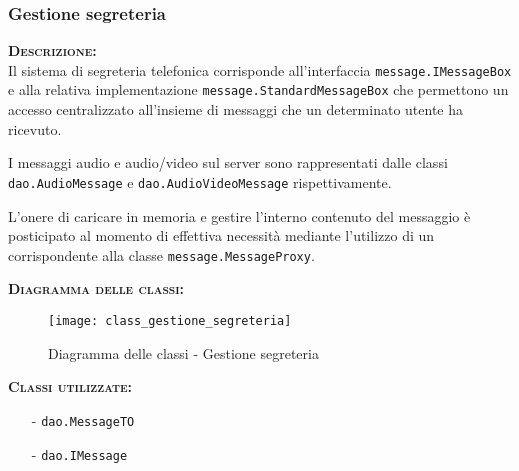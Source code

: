 \subsubsection{Gestione segreteria}
\begin{description}
	\item{\scshape\bfseries Descrizione:}\\
Il sistema di segreteria telefonica corrisponde all'interfaccia \texttt{message.IMessageBox} e alla relativa implementazione \texttt{message.StandardMessageBox} che permettono un accesso centralizzato all'insieme di messaggi che un determinato utente ha ricevuto.

I messaggi audio e audio/video sul server sono rappresentati dalle classi \texttt{dao.AudioMessage} e \texttt{dao.AudioVideoMessage} rispettivamente.

L'onere di caricare in memoria e gestire l'interno contenuto del messaggio è posticipato al momento di effettiva necessità mediante l'utilizzo di un  corrispondente alla classe \texttt{message.MessageProxy}.
	\item{\scshape\bfseries Diagramma delle classi:}
\begin{figure}[H]
\begin{center}
\texttt{[image: class\_gestione\_segreteria]}
\caption{Diagramma delle classi - Gestione segreteria}\label{fig:gestione_segreteria}
\end{center}
\end{figure}	
	
	\item{\scshape\bfseries Classi utilizzate:}
	\begin{itemize}[noitemsep,nolistsep]
	  \item[-] \texttt{dao.MessageTO}
	  \item[-] \texttt{dao.IMessage}
	\end{itemize}
\end{description}

